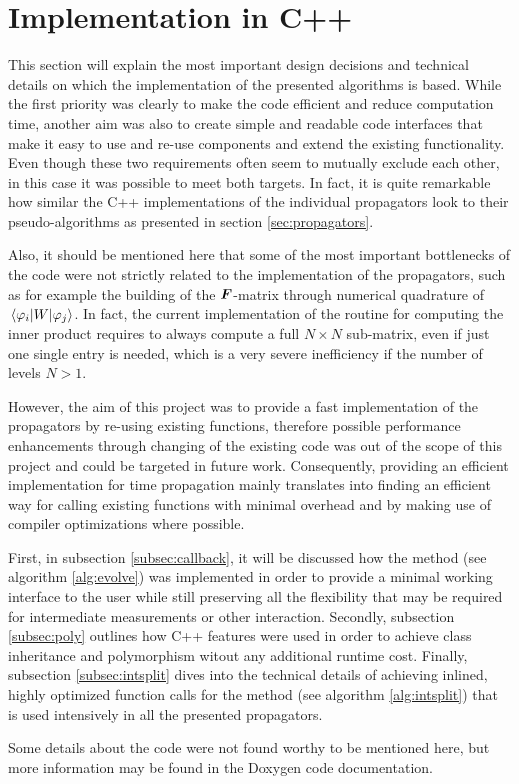 \section{Implementation in C++}
%
This section will explain the most important design decisions and technical details on which the implementation of the presented algorithms is based.
While the first priority was clearly to make the code efficient and reduce computation time, another aim was also to create simple and readable code interfaces that make it easy to use and re-use components and extend the existing functionality. \\
%
Even though these two requirements often seem to mutually exclude each other, in this case it was possible to meet both targets.
In fact, it is quite remarkable how similar the C++ implementations of the individual propagators look to their pseudo-algorithms as presented in section \ref{sec:propagators}.
\par\medskip
%
Also, it should be mentioned here that some of the most important bottlenecks of the code were not strictly related to the implementation of the propagators, such as for example the building of the $\bm{F}$-matrix through numerical quadrature of $\matrixel{\varphi_i}{W}{\varphi_j}$.
In fact, the current implementation of the  routine for computing the inner product requires to always compute a full $N \times N$ sub-matrix, even if just one single entry is needed, which is a very severe inefficiency if the number of levels $N>1$.
\par\medskip
%
However, the aim of this project was to provide a fast implementation of the propagators by re-using existing functions, therefore possible performance enhancements through changing of the existing code was out of the scope of this project and could be targeted in future work.
Consequently, providing an efficient implementation for time propagation mainly translates into finding an efficient way for calling existing functions with minimal overhead and by making use of compiler optimizations where possible.
\par\medskip
%
First, in subsection \ref{subsec:callback}, it will be discussed how the  method (see algorithm \ref{alg:evolve}) was implemented in order to provide a minimal working interface to the user while still preserving all the flexibility that may be required for intermediate measurements or other interaction.
Secondly, subsection \ref{subsec:poly} outlines how C++ features were used in order to achieve class inheritance and polymorphism witout any additional runtime cost.
Finally, subsection \ref{subsec:intsplit} dives into the technical details of achieving inlined, highly optimized function calls for the  method (see algorithm \ref{alg:intsplit}) that is used intensively in all the presented propagators.
\par\medskip
%
Some details about the code were not found worthy to be mentioned here,
but more information may be found in the Doxygen code documentation.


